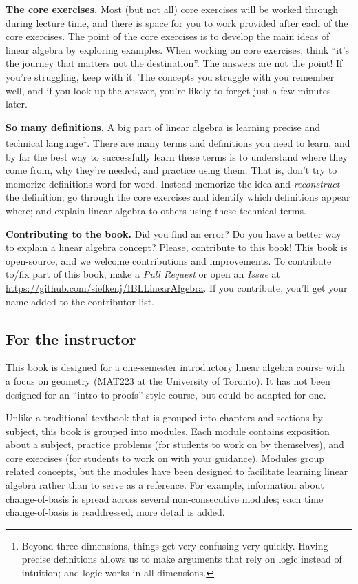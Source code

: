 {\bf The core exercises.} Most (but not all) core exercises will be
worked through during lecture time, and there is space for you to work
provided after each
of the core exercises. The point of the core exercises is to develop the main ideas of
linear algebra by exploring examples. When working on core exercises, think
``it's the journey that matters not the destination''. The
answers are not the point! If you're struggling, keep with it. The
concepts you struggle with you remember well, and if you look up the
answer, you're likely to forget just a few minutes later. 

{\bf So many definitions.} A big part of linear algebra is learning precise and
technical language\footnote{ Beyond three dimensions, things get very confusing
very quickly.  Having precise definitions allows us to make arguments that
rely on logic instead of intuition; and logic works in all dimensions.}.
There are many terms and definitions you need to learn, and by far the
best way to successfully learn these terms is to understand where they
come from, why they're needed, and practice using them. That is, don't
try to memorize definitions word for word. Instead memorize the idea
and \emph{reconstruct} the definition; go through the core exercises and
identify which definitions appear where; and explain linear algebra to
others using these technical terms.

{\bf Contributing to the book.} Did you find an error? Do you
have a better way to explain a linear algebra concept? Please,
contribute to this book!  This book is open-source, and we welcome
contributions and improvements. To contribute to/fix part of
this book, make a \emph{Pull Request} or open an \emph{Issue} at
\url{https://github.com/siefkenj/IBLLinearAlgebra}. If you contribute,
you'll get your name added to the contributor list.


\subsection*{For the instructor}

This book is designed for a one-semester introductory linear algebra course
with a focus on geometry (MAT223 at the University of Toronto). 
It has not been designed for an ``intro to proofs''-style course, but could be adapted for one.

Unlike a traditional textbook that is grouped into chapters and sections
by subject, this book is grouped into modules. Each module contains exposition
about a subject, practice problems (for students to work on by themselves), and core exercises
(for students to work on with your guidance). Modules group related concepts, but the 
modules have been designed to facilitate learning linear algebra rather than to serve
as a reference. For example, information about change-of-basis is spread across several non-consecutive
modules; each time change-of-basis is readdressed, more detail is added.


